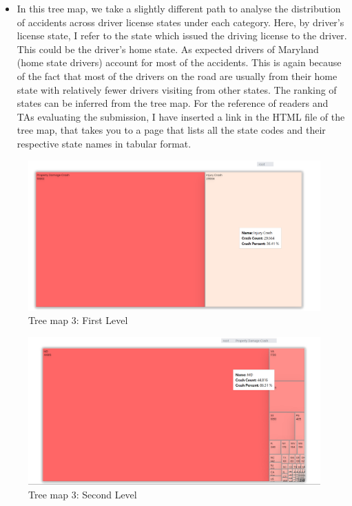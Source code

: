 \documentclass[conference]{IEEEtran}
\begin{document}
\begin{enumerate}
\begin{enumerate}
\begin{itemize}
        \item In this tree map, we take a slightly different path to analyse the distribution of accidents across driver license states under each category. Here, by driver's license state, I refer to the state which issued the driving license to the driver. This could be the driver's home state. As expected drivers of Maryland (home state drivers) account for most of the accidents. This is again because of the fact that most of the drivers on the road are usually from their home state with relatively fewer drivers visiting from other states. The ranking of states can be inferred from the tree map.
        For the reference of readers and TAs evaluating the submission, I have inserted a link in the HTML file of the tree map, that takes you to a page that lists all the state codes and their respective state names in tabular format.
    \end{itemize}
\end{enumerate}


\begin{figure}
        \centering
        \includegraphics[width=1\linewidth]{tree-map3_level1.png}
        \caption{Tree map 3: First Level }
        \label{fig:enter-label}
    \end{figure}
    \begin{figure}
        \centering
        \includegraphics[width=1\linewidth]{tree-map3_level2.png}
        \caption{Tree map 3: Second Level }
        \label{fig:enter-label}
    \end{figure}
    







\end{enumerate}
\end{document}
